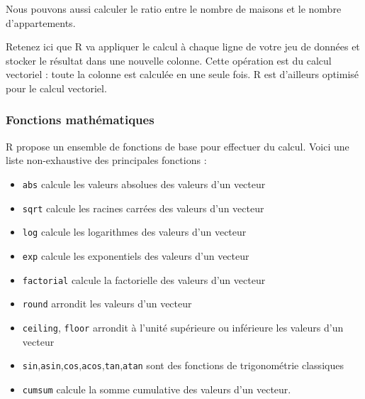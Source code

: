 \documentclass[
  11pt,
  french,
]{book}
\makeatletter
\newenvironment{Shaded}{\begin{snugshade}}{\end{snugshade}}
\newcommand{\CommentTok}[1]{\textcolor[rgb]{0.56,0.35,0.01}{\textit{#1}}}
\newcommand{\NormalTok}[1]{#1}
\newcommand{\OperatorTok}[1]{\textcolor[rgb]{0.81,0.36,0.00}{\textbf{#1}}}
\newcommand{\StringTok}[1]{\textcolor[rgb]{0.31,0.60,0.02}{#1}}
\providecommand{\tightlist}{%
  \setlength{\itemsep}{0pt}\setlength{\parskip}{0pt}}
\newenvironment{kframe}{%
\medskip{}
\setlength{\fboxsep}{.8em}
 \def\at@end@of@kframe{}%
 \ifinner\ifhmode%
  \def\at@end@of@kframe{\end{minipage}}%
  \begin{minipage}{\columnwidth}%
 \fi\fi%
 \def\FrameCommand##1{\hskip\@totalleftmargin \hskip-\fboxsep
 \colorbox{shadecolor}{##1}\hskip-\fboxsep
     \hskip-\linewidth \hskip-\@totalleftmargin \hskip\columnwidth}%
 \MakeFramed {\advance\hsize-\width
   \@totalleftmargin\z@ \linewidth\hsize
   \@setminipage}}%
 {\par\unskip\endMakeFramed%
 \at@end@of@kframe}
\renewenvironment{Shaded}{\begin{kframe}}{\end{kframe}}
\makeatother
\begin{document}
Nous pouvons aussi calculer le ratio entre le nombre de maisons et le nombre d'appartements.

\begin{Shaded}
\end{Shaded}

Retenez ici que R va appliquer le calcul à chaque ligne de votre jeu de données et stocker le résultat dans une nouvelle colonne. Cette opération est du calcul vectoriel : toute la colonne est calculée en une seule fois. R est d'ailleurs optimisé pour le calcul vectoriel.

\hypertarget{sect01424}{%
\subsubsection{Fonctions mathématiques}\label{sect01424}}

R propose un ensemble de fonctions de base pour effectuer du calcul. Voici une liste non-exhaustive des principales fonctions :

\begin{itemize}
\tightlist
\item
  \texttt{abs} calcule les valeurs absolues des valeurs d'un vecteur
\item
  \texttt{sqrt} calcule les racines carrées des valeurs d'un vecteur
\item
  \texttt{log} calcule les logarithmes des valeurs d'un vecteur
\item
  \texttt{exp} calcule les exponentiels des valeurs d'un vecteur
\item
  \texttt{factorial} calcule la factorielle des valeurs d'un vecteur
\item
  \texttt{round} arrondit les valeurs d'un vecteur
\item
  \texttt{ceiling}, \texttt{floor} arrondit à l'unité supérieure ou inférieure les valeurs d'un vecteur
\item
  \texttt{sin},\texttt{asin},\texttt{cos},\texttt{acos},\texttt{tan},\texttt{atan} sont des fonctions de trigonométrie classiques
\item
  \texttt{cumsum} calcule la somme cumulative des valeurs d'un vecteur.
\end{itemize}
\end{document}
